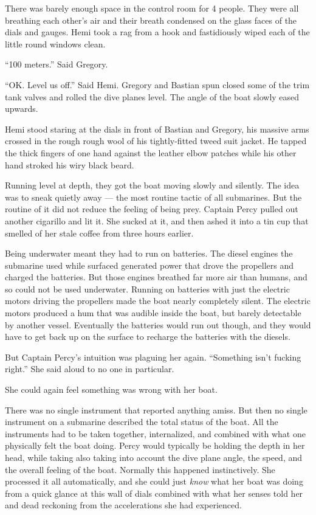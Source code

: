 \documentclass[
]{scrbook}
\begin{document}
There was barely enough space in the control room for 4 people. They
were all breathing each other's air and their breath condensed on the
glass faces of the dials and gauges. Hemi took a rag from a hook and
fastidiously wiped each of the little round windows clean.

``100 meters.'' Said Gregory.

``OK. Level us off.'' Said Hemi. Gregory and Bastian spun closed some of
the trim tank valves and rolled the dive planes level. The angle of the
boat slowly eased upwards.

Hemi stood staring at the dials in front of Bastian and Gregory, his
massive arms crossed in the rough rough wool of his tightly-fitted tweed
suit jacket. He tapped the thick fingers of one hand against the leather
elbow patches while his other hand stroked his wiry black beard.

Running level at depth, they got the boat moving slowly and silently.
The idea was to sneak quietly away --- the most routine tactic of all
submarines. But the routine of it did not reduce the feeling of being
prey. Captain Percy pulled out another cigarillo and lit it. She sucked
at it, and then ashed it into a tin cup that smelled of her stale coffee
from three hours earlier.

Being underwater meant they had to run on batteries. The diesel engines
the submarine used while surfaced generated power that drove the
propellers and charged the batteries. But those engines breathed far
more air than humans, and so could not be used underwater. Running on
batteries with just the electric motors driving the propellers made the
boat nearly completely silent. The electric motors produced a hum that
was audible inside the boat, but barely detectable by another vessel.
Eventually the batteries would run out though, and they would have to
get back up on the surface to recharge the batteries with the diesels.

But Captain Percy's intuition was plaguing her again. ``Something isn't
fucking right.'' She said aloud to no one in particular.

She could again feel something was wrong with her boat.

There was no single instrument that reported anything amiss. But then no
single instrument on a submarine described the total status of the boat.
All the instruments had to be taken together, internalized, and combined
with what one physically felt the boat doing. Percy would typically be
holding the depth in her head, while taking also taking into account the
dive plane angle, the speed, and the overall feeling of the boat.
Normally this happened instinctively. She processed it all
automatically, and she could just \emph{know} what her boat was doing
from a quick glance at this wall of dials combined with what her senses
told her and dead reckoning from the accelerations she had experienced.
\end{document}
